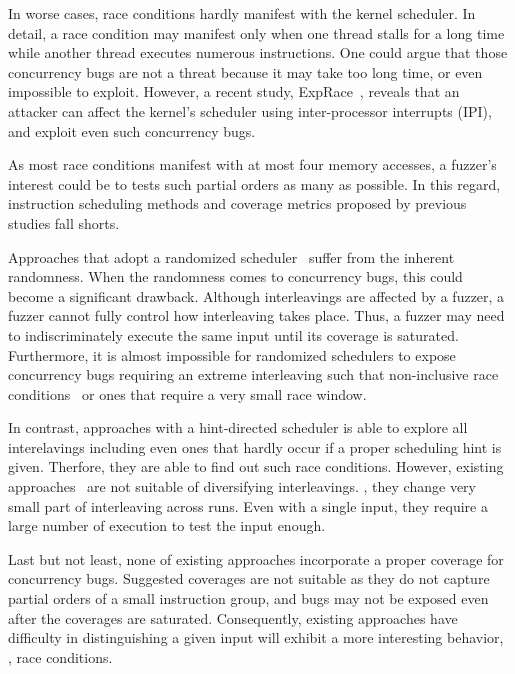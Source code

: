 In worse cases, race conditions hardly manifest with the kernel
scheduler. In detail, a race condition may manifest only when one
thread stalls for a long time while another thread executes numerous
instructions.
%
One could argue that those concurrency bugs are not a threat because
it may take too long time, or even impossible to exploit.
%
However, a recent study, ExpRace~\cite{exprace}, reveals that an
attacker can affect the kernel's scheduler using inter-processor
interrupts (IPI), and exploit even such concurrency bugs.



%
As most race conditions manifest with at most four memory accesses, a
fuzzer's interest could be to tests such partial orders as many as
possible.
%
In this regard, instruction scheduling methods and coverage metrics
proposed by previous studies fall shorts.


%
Approaches that adopt a randomized scheduler~\cite{krace, ski, muzz}
suffer from the inherent randomness.
%
When the randomness comes to concurrency bugs, this could become a
significant drawback.
%
Although interleavings are affected by a fuzzer, a fuzzer cannot fully
control how interleaving takes place. Thus, a fuzzer may need to
indiscriminately execute the same input until its coverage is
saturated.
%
Furthermore, it is almost impossible for randomized schedulers to
expose concurrency bugs requiring an extreme interleaving such that
non-inclusive race conditions~\cite{exprace} or ones that
require a very small race window.


In contrast, approaches with a hint-directed scheduler is able to
explore all interelavings including even ones that hardly occur if a
proper scheduling hint is given. Therfore, they are able to find out
such race conditions.
%
However, existing approaches~\cite{razzer, snowboard} are not suitable
of diversifying interleavings. \ie, they change very small part of
interleaving across runs.
%
Even with a single input, they require a large number of execution to
test the input enough.

Last but not least, none of existing approaches incorporate a proper
coverage for concurrency bugs. Suggested coverages are not suitable as
they do not capture partial orders of a small instruction group, and
bugs may not be exposed even after the coverages are saturated.
Consequently, existing approaches have difficulty in distinguishing a
given input will exhibit a more interesting behavior, \ie, race
conditions.


